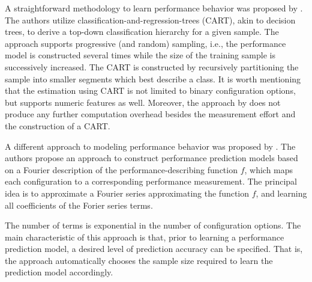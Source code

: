 A straightforward methodology to learn performance behavior was proposed by
\citep{guo_variability-aware_2013}.
The authors utilize classification-and-regression-trees (CART), akin to decision trees, to derive a top-down classification hierarchy for a
given sample. The approach supports progressive (and random) sampling, i.e.,
the performance model is constructed several times while the size of the
training sample is successively increased. The CART is constructed by
recursively partitioning the sample into smaller segments which best describe a
class. It is worth mentioning that the estimation using CART is not limited to
binary configuration options, but supports numeric features as well. Moreover,
the approach by \citep{guo_variability-aware_2013} does not produce any further
computation overhead besides the measurement effort and the construction of a CART.

A different approach to modeling performance behavior was
proposed by \cite{zhang_performance_2015}. The authors propose an approach to construct
performance prediction models based on a Fourier description of the
performance-describing function $f$, which maps each configuration to a
corresponding performance measurement. The principal idea is to approximate a
Fourier series approximating the function  $f$, and
learning all coefficients of the Forier series terms.

The number of terms is exponential in the number of configuration options. The main
characteristic of this approach is that, prior to learning a performance
prediction model, a desired level of prediction accuracy can be specified. That
is, the approach automatically chooses the sample size required to learn the
prediction model accordingly.

